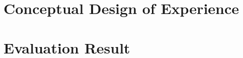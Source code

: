 \chapter{Conceptual Design of Experience}
\label{chapter:conept}
\thispagestyle{myheadings}

\graphicspath{{3_Body/Figures/}}

\clearpage



\chapter{Evaluation Result}
\label{chapter:evaluation}
\thispagestyle{myheadings}

\clearpage
